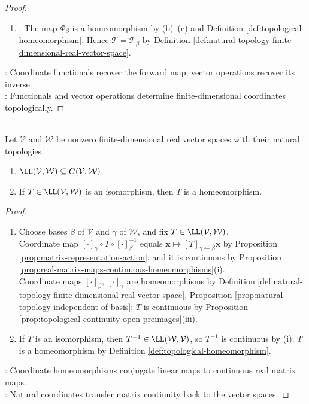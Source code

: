 \begin{theorem}
\begin{proof}
\begin{enumerate}[label=(\roman*)]
\begin{enumerate}[label=(\alph*)]
\item {}: The map $\Phi_{\beta}$ is a homeomorphism by (b)--(c) and Definition \ref{def:topological-homeomorphism}. Hence $\mathcal{T}=\mathcal{T}_{\beta}$ by Definition \ref{def:natural-topology-finite-dimensional-real-vector-space}.
\end{enumerate}
\end{enumerate}
: Coordinate functionals recover the forward map; vector operations recover its inverse.\\
: Functionals and vector operations determine finite-dimensional coordinates topologically.
\end{proof}
\end{theorem}

\begin{corollary} \label{cor:finite-dimensional-linear-maps-continuous} \\
Let $\mathcal{V}$ and $\mathcal{W}$ be nonzero finite-dimensional real vector spaces with their natural topologies.
\begin{enumerate}[label=(\roman*)]
\setlength{\itemsep}{0pt}
\item $\LL(\mathcal{V},\mathcal{W})\subseteq C(\mathcal{V},\mathcal{W})$.
\item If $T\in\LL(\mathcal{V},\mathcal{W})$ is an isomorphism, then $T$ is a homeomorphism.
\end{enumerate}
\begin{proof}
\begin{enumerate}[label=(\roman*)]
\setlength{\itemsep}{0pt}
\item Choose bases $\beta$ of $\mathcal{V}$ and $\gamma$ of $\mathcal{W}$, and fix $T\in\LL(\mathcal{V},\mathcal{W})$.\\
Coordinate map $[\cdot]_{\gamma}\circ T\circ[\cdot]_{\beta}^{-1}$ equals $\mathbf{x}\mapsto[T]_{\gamma\leftarrow\beta}\mathbf{x}$ by Proposition \ref{prop:matrix-representation-action}, and it is continuous by Proposition \ref{prop:real-matrix-maps-continuous-homeomorphisms}(i).\\
Coordinate maps $[\cdot]_{\beta}$, $[\cdot]_{\gamma}$ are homeomorphisms by Definition \ref{def:natural-topology-finite-dimensional-real-vector-space}, Proposition \ref{prop:natural-topology-independent-of-basis}; $T$ is continuous by Proposition \ref{prop:topological-continuity-open-preimages}(iii).
\item If $T$ is an isomorphism, then $T^{-1}\in\LL(\mathcal{W},\mathcal{V})$, so $T^{-1}$ is continuous by (i); $T$ is a homeomorphism by Definition \ref{def:topological-homeomorphism}.
\end{enumerate}
: Coordinate homeomorphisms conjugate linear maps to continuous real matrix maps.\\
: Natural coordinates transfer matrix continuity back to the vector spaces.
\end{proof}
\end{corollary}

